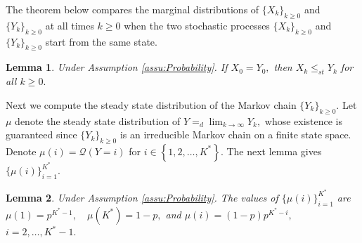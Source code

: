 \documentclass[12pt,technote,onecolumn]{IEEEtran}
\newtheorem{lemma}{Lemma}
\begin{document}
The theorem below compares the marginal distributions of $\{ X_{k}\} _{k\geq0}$
and $\{ Y_{k}\} _{k\geq0}$ at all times $k\geq0$ when
the two stochastic processes $\{ X_{k}\} _{k\geq0}$ and
$\{ Y_{k}\} _{k\geq0}$ start from the same state.
\begin{lemma}
	\label{lem:Stochastic dominance} Under Assumption \ref{assu:Probability}.
	If $X_{0}=Y_{0},$ then $X_{k}\leq_{st}Y_{k}$ for all $k\geq0.$
\end{lemma}

Next we compute the steady state distribution of the Markov chain
$\{ Y_{k}\} _{k\geq0}.$ Let $\mu$ denote the steady state
distribution of $Y=_{d}\lim_{k\rightarrow\infty}Y_{k},$ whose existence
is guaranteed since $\{ Y_{k}\} _{k\geq0}$ is an irreducible
Markov chain on a finite state space. Denote $\mu\left(i\right)=\mathcal{Q}\left(Y=i\right)$
for $i\in\left\{ 1,2,\ldots,K^{*}\right\} .$ The next lemma gives
$\{\mu(i)\} _{i=1}^{K^{*}}.$
\begin{lemma}
	\label{lem:Stationary distribution} Under Assumption \ref{assu:Probability}.
	The values of $\{\mu\left(i\right)\} _{i=1}^{K^{*}}$
	are 	
	$
	\mu\left(1\right)=p^{K^{*}-1},\quad\mu\left(K^{*}\right)=1-p,$ and   $\mu\left(i\right)=\left(1-p\right)p^{K^{*}-i},$ $i=2,\dots,K^{*}-1.$
\end{lemma}
\end{document}

